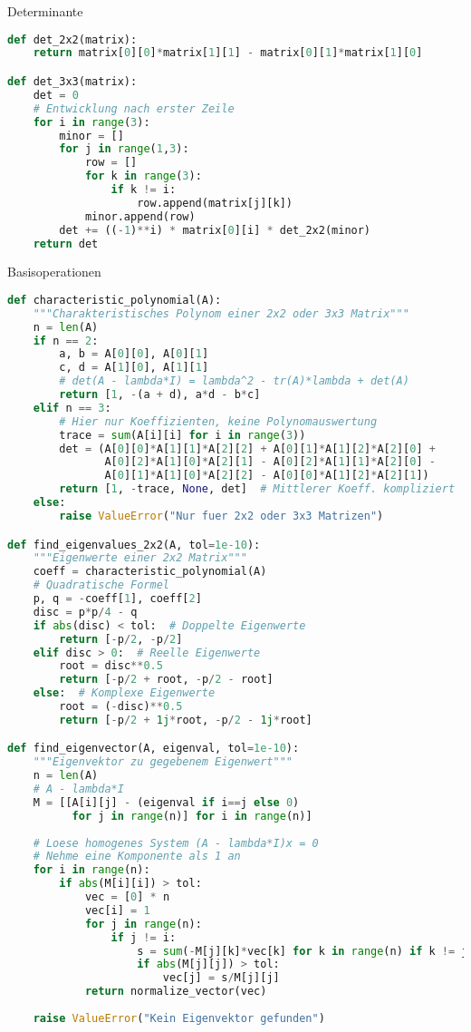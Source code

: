 \begin{examplecode}{Determinante}
\begin{lstlisting}[language=Python, style=basesmol]
def det_2x2(matrix):
    return matrix[0][0]*matrix[1][1] - matrix[0][1]*matrix[1][0]

def det_3x3(matrix):
    det = 0
    # Entwicklung nach erster Zeile
    for i in range(3):
        minor = []
        for j in range(1,3):
            row = []
            for k in range(3):
                if k != i:
                    row.append(matrix[j][k])
            minor.append(row)
        det += ((-1)**i) * matrix[0][i] * det_2x2(minor)
    return det
\end{lstlisting}
\end{examplecode}

\begin{examplecode}{Basisoperationen}
\begin{lstlisting}[language=Python, style=basesmol]
def characteristic_polynomial(A):
    """Charakteristisches Polynom einer 2x2 oder 3x3 Matrix"""
    n = len(A)
    if n == 2:
        a, b = A[0][0], A[0][1]
        c, d = A[1][0], A[1][1]
        # det(A - lambda*I) = lambda^2 - tr(A)*lambda + det(A)
        return [1, -(a + d), a*d - b*c]
    elif n == 3:
        # Hier nur Koeffizienten, keine Polynomauswertung
        trace = sum(A[i][i] for i in range(3))
        det = (A[0][0]*A[1][1]*A[2][2] + A[0][1]*A[1][2]*A[2][0] + 
               A[0][2]*A[1][0]*A[2][1] - A[0][2]*A[1][1]*A[2][0] - 
               A[0][1]*A[1][0]*A[2][2] - A[0][0]*A[1][2]*A[2][1])
        return [1, -trace, None, det]  # Mittlerer Koeff. kompliziert
    else:
        raise ValueError("Nur fuer 2x2 oder 3x3 Matrizen")

def find_eigenvalues_2x2(A, tol=1e-10):
    """Eigenwerte einer 2x2 Matrix"""
    coeff = characteristic_polynomial(A)
    # Quadratische Formel
    p, q = -coeff[1], coeff[2]
    disc = p*p/4 - q
    if abs(disc) < tol:  # Doppelte Eigenwerte
        return [-p/2, -p/2]
    elif disc > 0:  # Reelle Eigenwerte
        root = disc**0.5
        return [-p/2 + root, -p/2 - root]
    else:  # Komplexe Eigenwerte
        root = (-disc)**0.5
        return [-p/2 + 1j*root, -p/2 - 1j*root]

def find_eigenvector(A, eigenval, tol=1e-10):
    """Eigenvektor zu gegebenem Eigenwert"""
    n = len(A)
    # A - lambda*I
    M = [[A[i][j] - (eigenval if i==j else 0) 
          for j in range(n)] for i in range(n)]
    
    # Loese homogenes System (A - lambda*I)x = 0
    # Nehme eine Komponente als 1 an
    for i in range(n):
        if abs(M[i][i]) > tol:
            vec = [0] * n
            vec[i] = 1
            for j in range(n):
                if j != i:
                    s = sum(-M[j][k]*vec[k] for k in range(n) if k != j)
                    if abs(M[j][j]) > tol:
                        vec[j] = s/M[j][j]
            return normalize_vector(vec)
            
    raise ValueError("Kein Eigenvektor gefunden")
\end{lstlisting}
\end{examplecode}

